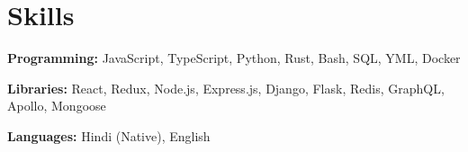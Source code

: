 \section{Skills}
  \vspace{2pt}
  \resumeSubHeadingListStart
    \small{\item{
        \textbf{Programming:}{
          JavaScript, TypeScript, Python, Rust, Bash, SQL, YML, Docker
                   } \\ \vspace{3pt}

        \textbf{Libraries:}{
            React, Redux, Node.js, Express.js, Django, Flask, Redis, GraphQL, Apollo, Mongoose
        } \\ \vspace{3pt}

        \textbf{Languages:}{ Hindi (Native), English}

    }}
  \resumeSubHeadingListEnd
